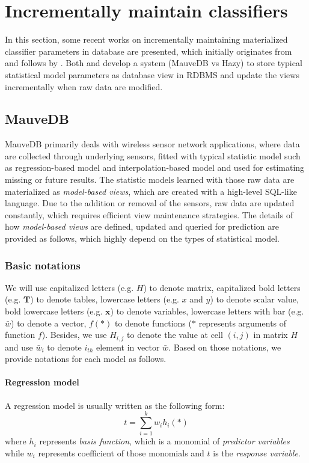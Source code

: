 \section{Incrementally maintain classifiers}
In this section, some recent works on incrementally maintaining materialized classifier parameters in database are presented, which initially originates from \cite{deshpande2006mauvedb} and follows by \cite{koc2011incrementally}. Both \cite{deshpande2006mauvedb} and \cite{koc2011incrementally} develop a system (MauveDB vs Hazy) to store typical statistical model parameters as database view in RDBMS and update the views incrementally when raw data are modified.   

\subsection{MauveDB}
MauveDB primarily deals with wireless sensor network applications, where data are collected through underlying sensors, fitted with typical statistic model such as regression-based model and interpolation-based model and used for estimating missing or future results. The statistic models learned with those raw data are materialized as {\em model-based views}, which are created with a high-level SQL-like language. Due to the addition or removal of the sensors, raw data are updated constantly, which requires efficient view maintenance strategies. The details of how {\em model-based views} are defined, updated and queried for prediction are provided as follows, which highly depend on the types of statistical model.

\subsubsection{Basic notations}
We will use capitalized letters (e.g. $H$) to denote matrix, capitalized bold letters (e.g. $\textbf{T}$) to denote tables, lowercase letters (e.g. $x$ and $y$) to denote scalar value, bold lowercase letters (e.g. $\textbf{x}$) to denote variables, lowercase letters with bar (e.g. $\bar{w}$) to denote a vector, $f(*)$ to denote functions ($*$ represents arguments of function $f$). Besides, we use $H_{i,j}$ to denote the value at cell $(i,j)$ in matrix $H$ and use $\bar{w}_i$ to denote $i_{th}$ element in vector $\bar{w}$. Based on those notations, we provide notations for each model as follows.

\paragraph{Regression model}
A regression model is usually written as the following form:
\begin{equation}
t=\sum_{i=1}^kw_ih_i(*)
\end{equation}
where $h_i$ represents {\em basis function}, which is a monomial of {\em predictor variables} while $w_i$ represents coefficient of those monomials and $t$ is the {\em response variable}.

